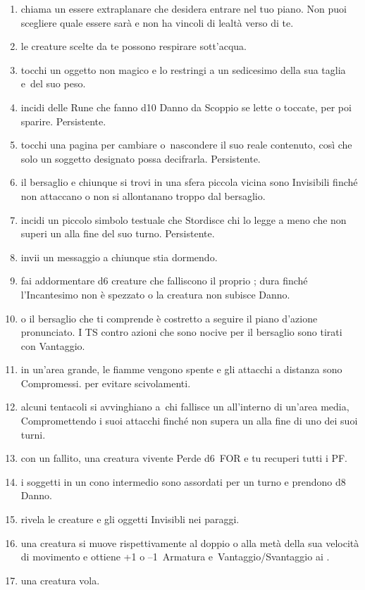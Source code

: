 \documentclass[itdr]{subfiles}
\begin{document}
\begin{enumerate}
	\item {} chiama un essere extraplanare che desidera entrare nel tuo piano. Non puoi scegliere quale essere sarà e non ha vincoli di lealtà verso di te.
	\item {} le creature scelte da te possono respirare sott'acqua.
	\item {} tocchi un oggetto non magico e lo restringi a un sedicesimo della sua taglia e~del suo peso.
	\item {} incidi delle Rune che fanno d10 Danno da Scoppio se lette o toccate, per poi sparire. Persistente.
	\item {} tocchi una pagina per cambiare o~nascondere il suo reale contenuto, così che solo un soggetto designato possa decifrarla. Persistente.
	\item {} il bersaglio e chiunque si trovi in una sfera piccola vicina sono Invisibili finché non attaccano o non si allontanano troppo dal bersaglio.
	\item {} incidi un piccolo simbolo testuale che Stordisce chi lo legge a meno che non superi un  alla fine del suo turno. Persistente.
	\item {} invii un messaggio a chiunque stia dormendo.
	\item {} fai addormentare d6 creature che falliscono il proprio ; dura finché l'Incantesimo non è spezzato o la creatura non subisce Danno.
	\item {}  o il bersaglio che ti comprende è costretto a seguire il piano d'azione pronunciato. I TS contro azioni che sono nocive per il bersaglio sono tirati con Vantaggio.
	\item {} in un'area grande, le fiamme vengono spente e gli attacchi a distanza sono Compromessi.  per evitare scivolamenti.
	\item {} alcuni tentacoli si avvinghiano a~chi fallisce un  all'interno di un'area media, Compromettendo i suoi attacchi finché non supera un  alla fine di uno dei suoi turni.
	\item {} con un  fallito, una creatura vivente Perde d6~FOR e tu recuperi tutti i PF.
	\item {} i soggetti in un cono intermedio sono assordati per un turno e prendono d8 Danno.
	\item {} rivela le creature e gli oggetti Invisibli nei paraggi.
	\item {} una creatura si muove rispettivamente al doppio o alla metà della sua velocità di movimento e ottiene +1 o --1~Armatura e~Vantaggio/Svantaggio ai .
	\item {} una creatura vola.
\end{enumerate}
\end{document}
